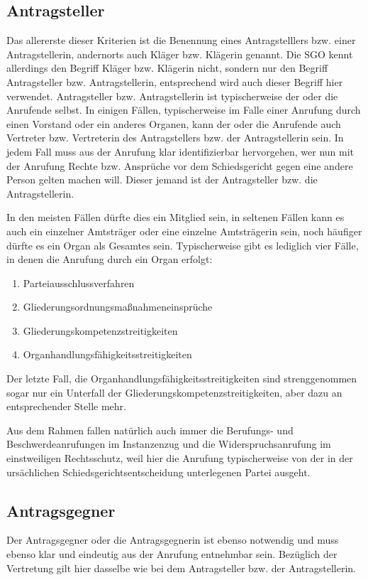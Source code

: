 \subsection{Antragsteller}
\label{Anrufung:Statthaftigkeit:Antragsteller}
Das allererste dieser Kriterien ist die Benennung eines  Antragstelllers bzw. einer Antragstellerin, andernorts auch Kläger bzw. Klägerin genannt.
Die SGO kennt allerdings den Begriff Kläger bzw. Klägerin nicht, sondern nur den Begriff Antragsteller bzw. Antragstellerin, entsprechend wird auch dieser Begriff hier verwendet.
Antragsteller bzw. Antragstellerin ist typischerweise der oder die Anrufende selbst.
In einigen Fällen, typischerweise im Falle einer Anrufung durch einen Vorstand oder ein anderes Organen, kann der oder die Anrufende auch Vertreter bzw. Vertreterin des Antragstellers bzw. der Antragstellerin sein.
In jedem Fall muss aus der Anrufung klar identifizierbar hervorgehen, wer nun mit der Anrufung Rechte bzw. Ansprüche vor dem Schiedsgericht gegen eine andere Person gelten machen will.
Dieser jemand ist der Antragsteller bzw. die Antragstellerin.

In den meisten Fällen dürfte dies ein Mitglied sein, in seltenen Fällen kann es auch ein einzelner Amtsträger oder eine einzelne Amtsträgerin sein, noch häufiger dürfte es ein Organ als Gesamtes sein.
Typischerweise gibt es lediglich vier Fälle, in denen die Anrufung durch ein Organ erfolgt:
\begin{enumerate}[label=\arabic*.)]
\item Parteiausschlussverfahren
\item Gliederungsordnungsmaßnahmeneinsprüche
\item Gliederungskompetenzstreitigkeiten
\item Organhandlungsfähigkeitsstreitigkeiten
\end{enumerate}
Der letzte Fall, die Organhandlungsfähigkeitsstreitigkeiten sind strenggenommen sogar nur ein Unterfall der Gliederungskompetenzstreitigkeiten, aber dazu an entsprechender Stelle mehr.

Aus dem Rahmen fallen natürlich auch immer die Berufungs- und Beschwerdeanrufungen im Instanzenzug und die Widerspruchsanrufung im einstweiligen Rechtsschutz, weil hier die Anrufung typischerweise von der in der ursächlichen Schiedsgerichtsentscheidung unterlegenen Partei ausgeht.

\subsection{Antragsgegner}
\label{Anrufung:Statthaftigkeit:Antragsgegner}
Der Antragsgegner oder die Antragsgegnerin ist ebenso notwendig und muss ebenso klar und eindeutig aus der Anrufung entnehmbar sein. Bezüglich der Vertretung gilt hier dasselbe wie bei dem  Antragsteller bzw. der Antragstellerin.

